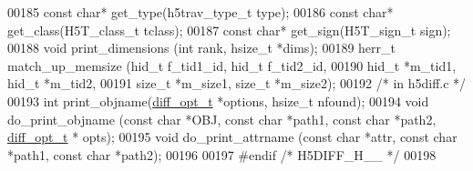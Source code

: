\begin{DoxyCode}
00185 \textcolor{keyword}{const} \textcolor{keywordtype}{char}* get\_type(h5trav\_type\_t type);
00186 \textcolor{keyword}{const} \textcolor{keywordtype}{char}* get\_class(H5T\_class\_t tclass);
00187 \textcolor{keyword}{const} \textcolor{keywordtype}{char}* get\_sign(H5T\_sign\_t sign);
00188 \textcolor{keywordtype}{void}        print\_dimensions (\textcolor{keywordtype}{int} rank, hsize\_t *dims);
00189 herr\_t      match\_up\_memsize (hid\_t f\_tid1\_id, hid\_t f\_tid2\_id,
00190                               hid\_t *m\_tid1, hid\_t *m\_tid2, 
00191                               \textcolor{keywordtype}{size\_t} *m\_size1, \textcolor{keywordtype}{size\_t}  *m\_size2);
00192 \textcolor{comment}{/* in h5diff.c */}
00193 \textcolor{keywordtype}{int}         print\_objname(\hyperlink{structdiff__opt__t}{diff\_opt\_t} *options, hsize\_t nfound);
00194 \textcolor{keywordtype}{void}        do\_print\_objname (\textcolor{keyword}{const} \textcolor{keywordtype}{char} *OBJ, \textcolor{keyword}{const} \textcolor{keywordtype}{char} *path1, \textcolor{keyword}{const} \textcolor{keywordtype}{char} *path2, 
      \hyperlink{structdiff__opt__t}{diff\_opt\_t} * opts);
00195 \textcolor{keywordtype}{void}        do\_print\_attrname (\textcolor{keyword}{const} \textcolor{keywordtype}{char} *attr, \textcolor{keyword}{const} \textcolor{keywordtype}{char} *path1, \textcolor{keyword}{const} \textcolor{keywordtype}{char} *path2);
00196 
00197 \textcolor{preprocessor}{#endif  }\textcolor{comment}{/* H5DIFF\_H\_\_ */}\textcolor{preprocessor}{}
00198 
\end{DoxyCode}
